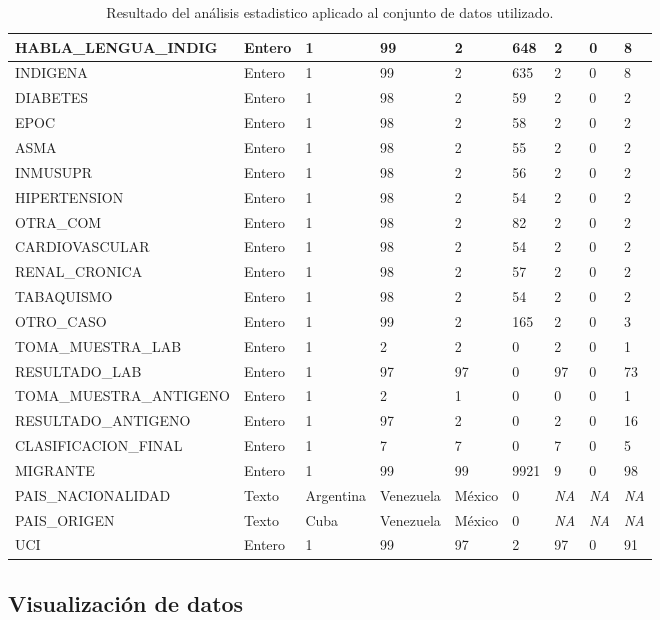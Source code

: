 \begin{table}[htbp]
\begin{tabular}{|p{4.5cm}|p{1.0cm}|p{1.5cm}|p{1.5cm}|p{1.5cm}|p{1.2cm}|p{1.0cm}|p{1.3cm}|p{1.1cm}|}
\hline
HABLA\_LENGUA\_INDIG & Entero & 1 & 99 & 2 & 648 & 2 & 0 & 8 \\
\hline
INDIGENA & Entero & 1 & 99 & 2 & 635 & 2 & 0 & 8 \\
\hline
DIABETES & Entero & 1 & 98 & 2 & 59 & 2 & 0 & 2 \\
\hline
EPOC & Entero & 1 & 98 & 2 & 58 & 2 & 0 & 2 \\
\hline
ASMA & Entero & 1 & 98 & 2 & 55 & 2 & 0 & 2 \\
\hline
INMUSUPR & Entero & 1 & 98 & 2 & 56 & 2 & 0 & 2 \\
\hline
HIPERTENSION & Entero & 1 & 98 & 2 & 54 & 2 & 0 & 2 \\
\hline
OTRA\_COM & Entero & 1 & 98 & 2 & 82 & 2 & 0 & 2 \\
\hline
CARDIOVASCULAR & Entero & 1 & 98 & 2 & 54 & 2 & 0 & 2 \\
\hline
RENAL\_CRONICA & Entero & 1 & 98 & 2 & 57 & 2 & 0 & 2 \\
\hline
TABAQUISMO & Entero & 1 & 98 & 2 & 54 & 2 & 0 & 2 \\
\hline
OTRO\_CASO & Entero & 1 & 99 & 2 & 165 & 2 & 0 & 3 \\
\hline
TOMA\_MUESTRA\_LAB & Entero & 1 & 2 & 2 & 0 & 2 & 0 & 1 \\
\hline
RESULTADO\_LAB & Entero & 1 & 97 & 97 & 0 & 97 & 0 & 73 \\
\hline
TOMA\_MUESTRA\_ANTIGENO & Entero & 1 & 2 & 1 & 0 & 0 & 0 & 1 \\
\hline
RESULTADO\_ANTIGENO & Entero & 1 & 97 & 2 & 0 & 2 & 0 & 16 \\
\hline
CLASIFICACION\_FINAL & Entero & 1 & 7 & 7 & 0 & 7 & 0 & 5 \\
\hline
MIGRANTE & Entero & 1 & 99 & 99 & 9921 & 9 & 0 & 98 \\
\hline
PAIS\_NACIONALIDAD & Texto & Argentina & Venezuela & México & 0 & \emph{NA} & \emph{NA} & \emph{NA} \\
\hline
PAIS\_ORIGEN & Texto & Cuba & Venezuela & México & 0 & \emph{NA} & \emph{NA} & \emph{NA} \\
\hline
UCI & Entero & 1 & 99 & 97 & 2 & 97 & 0 & 91 \\
\hline
\end{tabular}
\caption{Resultado del análisis estadistico aplicado al conjunto de datos utilizado.}
\label{Tab: Estadisticos}
\end{table}

\subsection{Visualización de datos}

